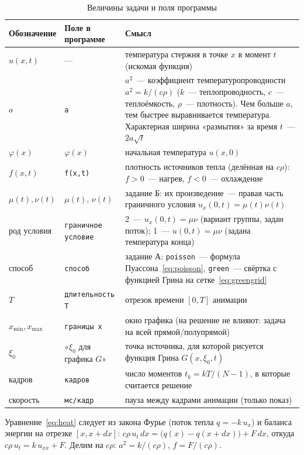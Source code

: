 \documentclass[a4paper,12pt]{article}
\newcommand{\code}[1]{\texttt{#1}}
\begin{document}
\begin{table}[H]
\centering
\caption{Величины задачи и поля программы}
\begin{tabularx}{\textwidth}{@{}l l X@{}}
\toprule
Обозначение & Поле в программе & Смысл\\
\midrule
$u(x,t)$ & --- & температура стержня в точке $x$ в момент $t$ (искомая функция)\\
$a$ & \code{a} & $a^2$~--- коэффициент температуропроводности $a^2=k/(c\rho)$
($k$~--- теплопроводность, $c$~--- теплоёмкость, $\rho$~--- плотность). Чем больше $a$,
тем быстрее выравнивается температура. Характерная ширина «размытия» за время $t$~--- $2a\sqrt t$\\
$\varphi(x)$ & $\varphi(x)$ & начальная температура $u(x,0)$\\
$f(x,t)$ & \code{f(x,t)} & плотность источников тепла (делённая на $c\rho$): $f>0$~--- нагрев, $f<0$~--- охлаждение\\
$\mu(t),\nu(t)$ & $\mu(t)$, $\nu(t)$ & задание Б: их произведение~--- правая часть
граничного условия $u_x(0,t)=\mu(t)\nu(t)$\\
род условия & \code{граничное условие} & 2~--- $u_x(0,t)=\mu\nu$ (вариант группы, задан поток);
1~--- $u(0,t)=\mu\nu$ (задана температура конца)\\
способ & \code{способ} & задание А: \code{poisson}~--- формула Пуассона~\eqref{eq:poisson},
\code{green}~--- свёртка с функцией Грина на сетке~\eqref{eq:greengrid}\\
$T$ & \code{длительность T} & отрезок времени $[0,T]$ анимации\\
$x_{\min},x_{\max}$ & \code{границы x} & окно графика (на решение не влияют: задача на всей прямой/полупрямой)\\
$\xi_0$ & «$\xi_0$ для графика $G$» & точка источника, для которой рисуется функция Грина $G(x,\xi_0,t)$\\
кадров & \code{кадров} & число моментов $t_k=kT/(N-1)$, в которые считается решение\\
скорость & \code{мс/кадр} & пауза между кадрами анимации (только показ)\\
\bottomrule
\end{tabularx}
\end{table}

Уравнение~\eqref{eq:heat} следует из закона Фурье (поток тепла $q=-k\,u_x$)
и баланса энергии на отрезке $[x,x+dx]$:
$c\rho\,u_t\,dx=\bigl(q(x)-q(x+dx)\bigr)+F\,dx$, откуда $c\rho\,u_t=k\,u_{xx}+F$.
Делим на $c\rho$: $a^2=k/(c\rho)$, $f=F/(c\rho)$.
\end{document}
